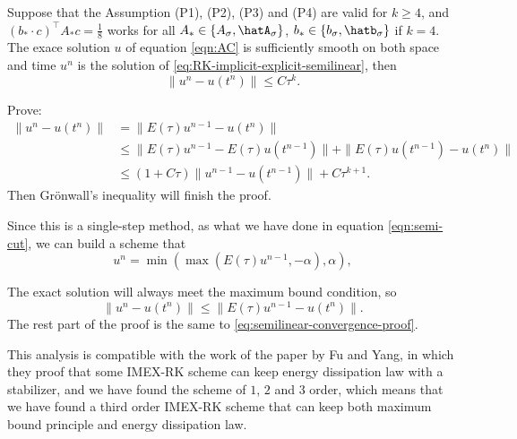 \begin{theorem}
    Suppose that the Assumption (P1), (P2), (P3) and (P4) are valid for $k \geq 4$, 
    and $(b_* \cdot c)^\top A_* c = \frac18 $  
    works for all $A_* \in \{A_\sigma, \hatA_\sigma\}$, 
    $b_* \in \{b_\sigma, \hatb_\sigma\}$ if $k=4$.  
    The exace solution $u$ of equation \eqref{eqn:AC} is sufficiently smooth 
    on both space and time $u^n$ is the solution of \eqref{eq:RK-implicit-explicit-semilinear}, 
    then
    \begin{equation}\label{eq:semilinear-convergence}
        \|u^{n} - u(t^{n})\| \leq C\tau^{k}.
    \end{equation}

\end{theorem}
Prove: 
\begin{equation}\label{eq:semilinear-convergence-proof}
    \begin{aligned}
    \|u^{n} - u(t^{n})\| &= \|E(\tau)u^{n-1} - u(t^{n})\|\\
    &\leq  \|E(\tau)u^{n-1} - E(\tau)u(t^{n-1})\| + \|E(\tau)u(t^{n-1}) - u(t^{n})\|\\
    &\leq  (1+C\tau) \|u^{n-1}- u(t^{n-1})\| + C\tau^{k+1} .
    \end{aligned}
\end{equation}
Then Gr\"onwall's inequality will finish the proof. 

\begin{remark}
    Since this is a single-step method, as what we have done in equation \eqref{eqn:semi-cut}, 
    we can build a scheme that
    \begin{equation} \label{eq:semilinear-cutoff}
        u^{n} =  \min(\max( E(\tau) u^{n-1},-\alpha),\alpha),
    \end{equation}

    The exact solution will always meet the maximum bound condition, 
    so $$\|u^{n} - u(t^{n})\| \leq \|E(\tau)u^{n-1} - u(t^{n})\|.$$
    The rest part of the proof is the same to \eqref{eq:semilinear-convergence-proof}. 
\end{remark}

\begin{remark}\label{Remark:IMEX-Energy}
    This analysis is compatible with the work of the paper by Fu and Yang, 
    in which they proof that 
    some IMEX-RK scheme can keep energy dissipation law with a stabilizer, 
    and we have found the scheme of $1$, $2$ and $3$ order, 
    which means that we have found a third order IMEX-RK scheme that can keep 
    both maximum bound principle and energy dissipation law.  
\end{remark}

